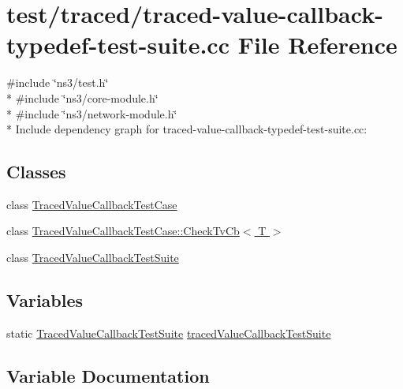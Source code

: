 \hypertarget{traced-value-callback-typedef-test-suite_8cc}{}\section{test/traced/traced-\/value-\/callback-\/typedef-\/test-\/suite.cc File Reference}
\label{traced-value-callback-typedef-test-suite_8cc}
{\ttfamily \#include \char`\"{}ns3/test.\+h\char`\"{}}\\*
{\ttfamily \#include \char`\"{}ns3/core-\/module.\+h\char`\"{}}\\*
{\ttfamily \#include \char`\"{}ns3/network-\/module.\+h\char`\"{}}\\*
Include dependency graph for traced-\/value-\/callback-\/typedef-\/test-\/suite.cc\+:
\subsection*{Classes}
\begin{DoxyCompactItemize}
\item 
class \hyperlink{classTracedValueCallbackTestCase}{Traced\+Value\+Callback\+Test\+Case}
\item 
class \hyperlink{classTracedValueCallbackTestCase_1_1CheckTvCb}{Traced\+Value\+Callback\+Test\+Case\+::\+Check\+Tv\+Cb$<$ T $>$}
\item 
class \hyperlink{classTracedValueCallbackTestSuite}{Traced\+Value\+Callback\+Test\+Suite}
\end{DoxyCompactItemize}
\subsection*{Variables}
\begin{DoxyCompactItemize}
\item 
static \hyperlink{classTracedValueCallbackTestSuite}{Traced\+Value\+Callback\+Test\+Suite} \hyperlink{traced-value-callback-typedef-test-suite_8cc_a8aa887488047182cd19028416d92c5c1}{traced\+Value\+Callback\+Test\+Suite}
\end{DoxyCompactItemize}


\subsection{Variable Documentation}
